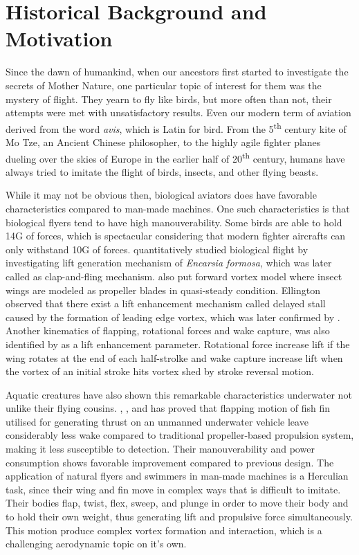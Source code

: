 \section{Historical Background and Motivation}
\label{sec:1}
Since the dawn of humankind, when our ancestors first started to investigate the secrets of Mother Nature, one particular topic of interest for them was the mystery of flight. They yearn to fly like birds, but more often than not, their attempts were met with unsatisfactory results. Even our modern term of aviation derived from the word \textit{avis}, which is Latin for bird. From the 5\textsuperscript{th} century kite of Mo Tze, an Ancient Chinese philosopher, to the highly agile fighter planes dueling over the skies of Europe in the earlier half of 20\textsuperscript{th} century, humans have always tried to imitate the flight of birds, insects, and other flying beasts.\par
While it may not be obvious then, biological aviators does have favorable characteristics compared to man-made machines. One such characteristics is that biological flyers tend to have high manouverability. Some birds are able to hold 14G of forces, which is spectacular considering that modern fighter aircrafts can only withstand 10G of forces. \citet{weisfogh} quantitatively studied biological flight by investigating lift generation mechanism of \textit{Encarsia formosa}, which was later called as clap-and-fling mechanism. \citet{ellington} also put forward vortex model where insect wings are modeled as propeller blades in quasi-steady condition. Ellington observed that there exist a lift enhancement mechanism called delayed stall caused by the formation of leading edge vortex, which was later confirmed by \citet{dickinson}. Another kinematics of flapping, rotational forces and wake capture, was also identified by \citet{sane} as a lift enhancement parameter. Rotational force increase lift if the wing rotates at the end of each half-strolke and wake capture increase lift when the vortex of an initial stroke hits vortex shed by stroke reversal motion.\par
Aquatic creatures have also shown this remarkable characteristics underwater not unlike their flying cousins. \citet{hu}, \citet{tan}, and \citet{yu} has proved that flapping motion of fish fin utilised for generating thrust on an unmanned underwater vehicle leave considerably less wake compared to traditional propeller-based propulsion system, making it less susceptible to detection. Their manouverability and power consumption shows favorable improvement compared to previous design. The application of natural flyers and swimmers in man-made machines is a Herculian task, since their wing and fin move in complex ways that is difficult to imitate. Their bodies flap, twist, flex, sweep, and plunge in order to move their body and to hold their own weight, thus generating lift and propulsive force simultaneously. This motion produce complex vortex formation and interaction, which is a challenging aerodynamic topic on it's own.\par
